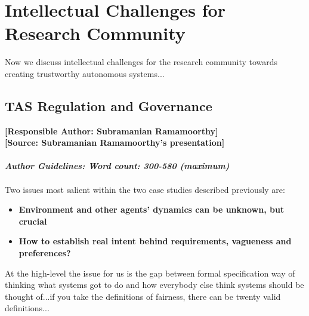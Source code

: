 \documentclass[sigconf]{acmart}
\begin{document}

\section{Intellectual Challenges for Research Community}
Now we discuss intellectual challenges for the research community towards creating trustworthy autonomous systems... \\


\subsection{TAS Regulation and Governance}
\noindent\textbf{[Responsible Author:  Subramanian Ramamoorthy]}\\
\noindent\textbf{[Source: Subramanian Ramamoorthy's presentation]}\\\\
\noindent\textbf{\textit{Author Guidelines: Word count: 300-580 (maximum)}}\\\\
Two issues most salient within the two case studies described previously are:
\begin{itemize}
	\item \textbf{Environment and other agents' dynamics can be unknown, but crucial}
	\item \textbf{How to establish real intent behind requirements, vagueness and preferences?}
\end{itemize}

At the high-level the issue for us is the gap between formal specification way of thinking what systems got to do and how everybody else think systems should be thought of...if you take the definitions of fairness, there can be twenty valid definitions...
\end{document}
